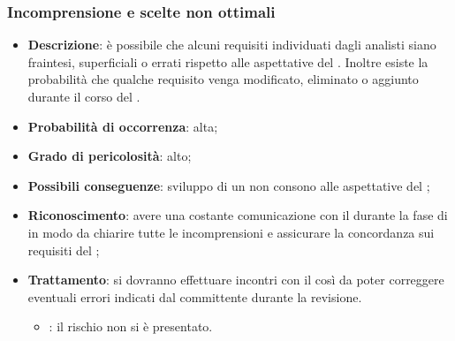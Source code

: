 \documentclass[PianoDiProgetto.tex]{subfiles}
\begin{document}
		\subsubsection{Incomprensione e scelte non ottimali}
			\label{sec:lr}
	\begin{itemize}
		\item \textbf{Descrizione}: è possibile che alcuni requisiti individuati dagli analisti siano fraintesi, superficiali o errati rispetto alle aspettative del  \PROPONENTE{}. Inoltre esiste la probabilità che qualche requisito venga modificato, eliminato o aggiunto durante il corso del .
		\item \textbf{Probabilità di occorrenza}: alta;
		\item \textbf{Grado di pericolosità}: alto;
		\item \textbf{Possibili conseguenze}: sviluppo di un  non consono alle aspettative del ;
		\item \textbf{Riconoscimento}: avere una costante comunicazione con il  \PROPONENTE{} durante la fase di \ARdoc{} in modo da chiarire tutte le incomprensioni e assicurare la concordanza sui requisiti del ;
		\item \textbf{Trattamento}: si dovranno effettuare incontri con il  \PROPONENTE{} così da poter correggere eventuali errori indicati dal committente durante la revisione.
		\begin{itemize}
				\item \ARdoc : il rischio non si è presentato.
		\end{itemize}
	\end{itemize}	
	
\end{document}
